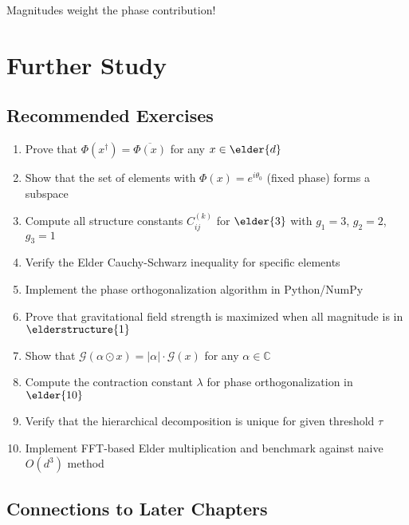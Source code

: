 \documentclass[12pt,a4paper]{article}
\theoremstyle{definition}
\theoremstyle{remark}
\begin{document}
Magnitudes weight the phase contribution!

\newpage
\section{Further Study}

\subsection{Recommended Exercises}

\begin{enumerate}
\item Prove that $\Phi(x^{\dagger}) = \overline{\Phi(x)}$ for any $x \in \elder{d}$

\item Show that the set of elements with $\Phi(x) = e^{i\theta_0}$ (fixed phase) forms a subspace

\item Compute all structure constants $C_{ij}^{(k)}$ for $\elder{3}$ with $g_1 = 3$, $g_2 = 2$, $g_3 = 1$

\item Verify the Elder Cauchy-Schwarz inequality for specific elements

\item Implement the phase orthogonalization algorithm in Python/NumPy

\item Prove that gravitational field strength is maximized when all magnitude is in $\elderstructure{1}$

\item Show that $\mathcal{G}(\alpha \odot x) = |\alpha| \cdot \mathcal{G}(x)$ for any $\alpha \in \mathbb{C}$

\item Compute the contraction constant $\lambda$ for phase orthogonalization in $\elder{10}$

\item Verify that the hierarchical decomposition is unique for given threshold $\tau$

\item Implement FFT-based Elder multiplication and benchmark against naive $O(d^3)$ method
\end{enumerate}

\subsection{Connections to Later Chapters}
\end{document}
